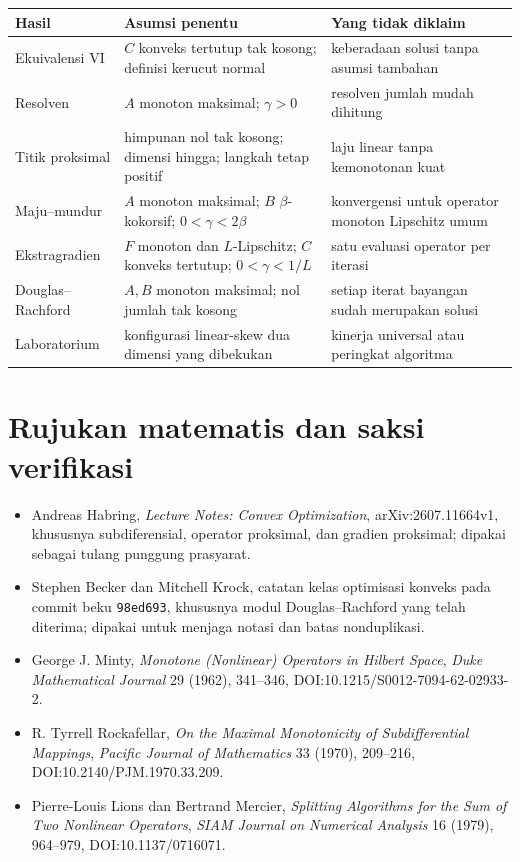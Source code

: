 \begin{center}
\begin{tabular}{p{}p{}p{}}
\hline
Hasil & Asumsi penentu & Yang tidak diklaim\\
\hline
Ekuivalensi VI & $C$ konveks tertutup tak kosong; definisi kerucut normal &
keberadaan solusi tanpa asumsi tambahan\\
Resolven & $A$ monoton maksimal; $\gamma>0$ & resolven jumlah mudah dihitung\\
Titik proksimal & himpunan nol tak kosong; dimensi hingga; langkah tetap positif &
laju linear tanpa kemonotonan kuat\\
Maju--mundur & $A$ monoton maksimal; $B$ $\beta$-kokorsif;
$0<\gamma<2\beta$ & konvergensi untuk operator monoton Lipschitz umum\\
Ekstragradien & $F$ monoton dan $L$-Lipschitz; $C$ konveks tertutup;
$0<\gamma<1/L$ & satu evaluasi operator per iterasi\\
Douglas--Rachford & $A,B$ monoton maksimal; nol jumlah tak kosong &
setiap iterat bayangan sudah merupakan solusi\\
Laboratorium & konfigurasi linear-skew dua dimensi yang dibekukan &
kinerja universal atau peringkat algoritma\\
\hline
\end{tabular}
\end{center}

\section*{Rujukan matematis dan saksi verifikasi}
\begingroup\sloppy
\begin{itemize}
  \item Andreas Habring, \emph{Lecture Notes: Convex Optimization},
    arXiv:2607.11664v1, khususnya subdiferensial, operator proksimal, dan
    gradien proksimal; dipakai sebagai tulang punggung prasyarat.
  \item Stephen Becker dan Mitchell Krock, catatan kelas optimisasi konveks
    pada commit beku \texttt{98ed693}, khususnya modul Douglas--Rachford yang
    telah diterima; dipakai untuk menjaga notasi dan batas nonduplikasi.
  \item George J. Minty, \emph{Monotone (Nonlinear) Operators in Hilbert
    Space}, \emph{Duke Mathematical Journal} 29 (1962), 341--346,
    DOI:10.1215/S0012-7094-62-02933-2.
  \item R. Tyrrell Rockafellar, \emph{On the Maximal Monotonicity of
    Subdifferential Mappings}, \emph{Pacific Journal of Mathematics} 33
    (1970), 209--216, DOI:10.2140/PJM.1970.33.209.
  \item Pierre-Louis Lions dan Bertrand Mercier, \emph{Splitting Algorithms
    for the Sum of Two Nonlinear Operators}, \emph{SIAM Journal on Numerical
    Analysis} 16 (1979), 964--979, DOI:10.1137/0716071.
\end{itemize}
\endgroup
